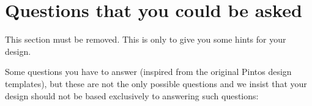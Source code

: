 
\subsubsection{\taskC}


\section{Questions that you could be asked}

This section must be removed. This is only to give you some hints for your design. 

Some questions you have to answer (inspired from the original Pintos design templates), but these are not the only possible questions and we insist that your design should not be based exclusively to answering such questions:
